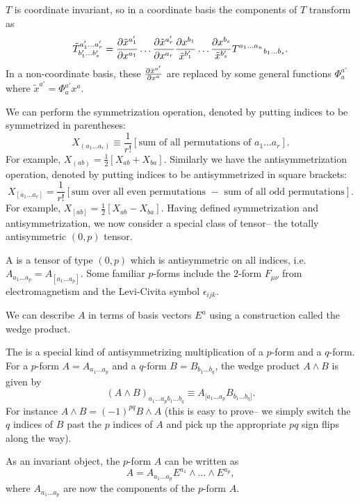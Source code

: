 $T$ is coordinate invariant, so in a coordinate basis the components of $T$ transform as
$${{\tilde T}^{a_1'\ldots a_r'}}_{b_1'\ldots b_s'}=\frac{\partial \tilde x^{a_1'}}{\partial x^{a_1}} \ldots \frac{\partial \tilde x^{a_r'}}{\partial x^{a_r}} \frac{\partial x^{b_1}}{\tilde x^{b_1'}} \ldots \frac{\partial x^{b_s}}{\tilde x^{b_s'}} {T^{a_1\ldots a_n}}_{b_1\ldots b_s}.$$
In a non-coordinate basis, these $\frac{\partial \tilde x^{a'}}{\partial x^a}$ are replaced by some general functions $\Phi ^{a'}_a$ where $\tilde x^{a'}=\Phi^{a'}_a x^a$.

We can perform the symmetrization operation, denoted by putting indices to be symmetrized in parentheses:
$$X_{(a_1 \ldots a_r)}\equiv \frac{1}{r!}\left[\text{sum of all permutations of }a_1\ldots a_r\right].$$
For example, $X_{(ab)}=\frac{1}{2}\left[X_{ab}+X_{ba}\right]$. Similarly we have the antisymmetrization operation, denoted by putting indices to be antisymmetrized in square brackets:
$$X_{[a_1\ldots a_r]}=\frac{1}{r!}\left[\text{sum over all even permutations } - \text { sum of all odd permutations}\right].$$
For example, $X_{[ab]}=\frac{1}{2}[X_{ab}-X_{ba}].$ Having defined symmetrization and antisymmetrization, we now consider a special class of tensor-- the totally antisymmetric $(0,p)$ tensor.

\begin{defn}
A  is a tensor of type $(0,p)$ which is antisymmetric on all indices, i.e. $A_{a_1\ldots a_p}=A_{[a_1 \ldots a_p]}$. Some familiar $p$-forms include the $2$-form $F_{\mu\nu}$ from electromagnetism and the Levi-Civita symbol $\epsilon_{ijk}$.
\end{defn}
We can describe $A$ in terms of basis vectors $E^a$ using a construction called the wedge product.
\begin{defn}
The  is a special kind of antisymmetrizing multiplication of a $p$-form and a $q$-form. For a $p$-form $A=A_{a_1\ldots a_p}$ and a $q$-form $B=B_{b_1\ldots b_q}$, the wedge product $A\wedge B$ is given by
$$(A\wedge B)_{a_1\ldots a_p b_1 \ldots b_q}\equiv A_{[a_1\ldots a_p}B_{b_1\ldots b_q]}.$$
For instance $A\wedge B = (-1)^{pq}B \wedge A$ (this is easy to prove-- we simply switch the $q$ indices of $B$ past the $p$ indices of $A$ and pick up the appropriate $pq$ sign flips along the way).
\end{defn}
As an invariant object, the $p$-form $A$ can be written as $$A=A_{a_1\ldots a_p} E^{a_1}\wedge \ldots \wedge E^{a_p},$$ where $A_{a_1\ldots a_p}$ are now the components of the $p$-form $A$.

